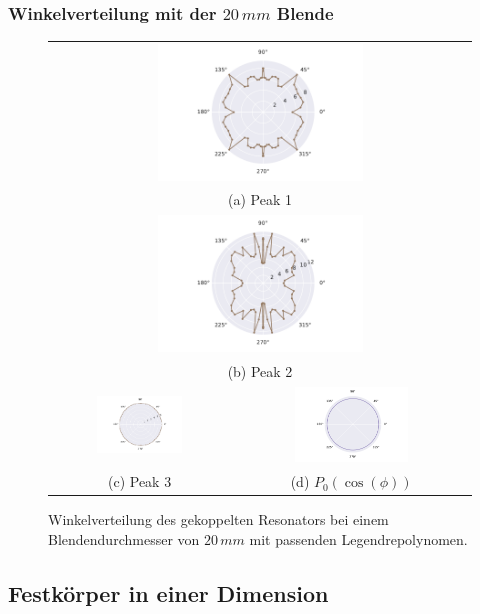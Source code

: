 \subsubsection{Winkelverteilung mit der $20 \, mm$ Blende}
\begin{figure}[H]
  \centering
  \begin{tabular}{cc}
  \multicolumn{2}{c}{\includegraphics[width=0.5\textwidth]{Daten/Wasserstoffmolekuelion/peak0.pdf}}\\[6pt]
  \multicolumn{2}{c}{(a) Peak 1}\\[6pt]
  \multicolumn{2}{c}{\includegraphics[width=0.5\textwidth]{Daten/Wasserstoffmolekuelion/peak1.pdf}}\\[6pt]
  \multicolumn{2}{c}{(b) Peak 2}\\[6pt]
  \includegraphics[width=0.5\textwidth]{Daten/Wasserstoffmolekuelion/peak2.pdf} &   \includegraphics[width=0.5\textwidth]{Daten/Wasserstoffmolekuelion/peakLeg.pdf}\\[6pt]
  (c)  Peak 3 & (d)  $P_0(\cos(\phi))$ \\[6pt]
  \end{tabular}
  \caption{Winkelverteilung des gekoppelten Resonators bei einem Blendendurchmesser von $20\, mm$ mit passenden Legendrepolynomen.} 
  \label{fig:h2_2}
\end{figure}
\subsection{Festkörper in einer Dimension}